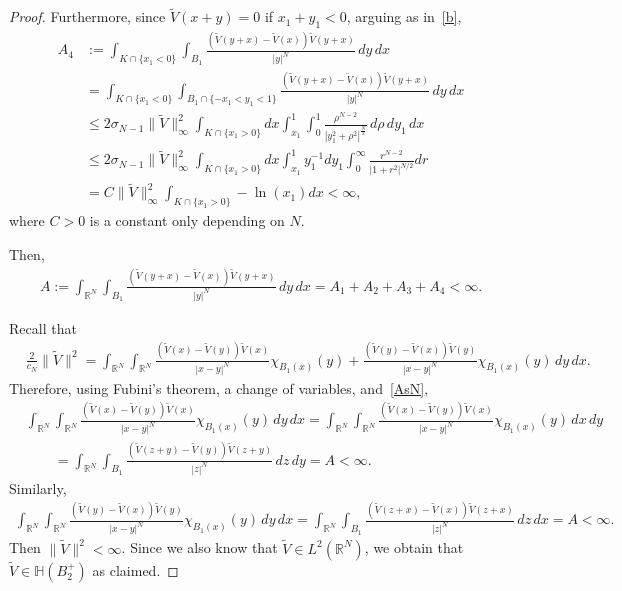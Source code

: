 \documentclass[11pt]{article}
\newcommand{\R}{\mathbb{R}}
\numberwithin{equation}{section}
\begin{document}
\begin{proof}
Furthermore, since $\widetilde V(x+y)=0$ if $x_1+y_1<0$, arguing as in~\eqref{b},
\begin{align*}
A_4&
:=\int_{K\cap\{x_1<0\}}\int_{B_1}\frac{(\widetilde V(y+x)-\widetilde V(x))\widetilde V(y+x)}{|y|^N} \, dy\, dx\\
&=\int_{K\cap\{x_1<0\}}\int_{B_1\cap\{-x_1<y_1<1\}}\frac{(\widetilde V(y+x)-\widetilde V(x))\widetilde V(y+x)}{|y|^N} \, dy\, dx\\
&\leq 2\sigma_{N-1}\|\widetilde V\|^2_\infty\int_{K\cap\{x_1>0\}}dx\int_{x_1}^1\int_0^1 \frac{\rho^{N-2}}{|y_1^2+\rho^2|^{\frac{N}{2}}} \,d\rho\, dy_1\, dx
\\
& \leq 2\sigma_{N-1}\|\widetilde V\|^2_\infty\int_{K\cap\{x_1>0\}} dx \int_{x_1}^{1}y_1^{-1}dy_1\int_0^\infty \frac{r^{N-2}}{|1+r^2|^{N/2}}dr\\
&= C \|\widetilde V\|^2_\infty \int_{K\cap\{x_1>0\}}-\ln(x_1) dx < \infty,
\end{align*}
where $C>0$ is a constant only depending on $N$.

Then,
\begin{align}\label{AsN}
A:=\int_{\R^N}\int_{B_1}\frac{(\widetilde V(y+x)-\widetilde V(x))\widetilde V(y+x)}{|y|^N}
    \, dy\, dx=A_1+A_2+A_3+A_4<\infty.
\end{align}

Recall that
\begin{align*}
&\frac{2}{c_N}\|\widetilde V\|^2
=\int_{\R^N}\int_{\R^N}
    \frac{(\widetilde V(x)-\widetilde V(y))\widetilde V(x)}{|x-y|^N}\chi_{B_1(x)}(y)
    +\frac{(\widetilde V(y)-\widetilde V(x))\widetilde V(y)}{|x-y|^N}\chi_{B_1(x)}(y)
    \, dy\, dx.
\end{align*}
Therefore, using Fubini's theorem, a change of variables,
and~\eqref{AsN},
    \begin{align*}
&\int_{\R^N}\int_{\R^N}
    \frac{(\widetilde V(x)-\widetilde V(y))\widetilde V(x)}{|x-y|^N}\chi_{B_1(x)}(y)
    \, dy\, dx
    =\int_{\R^N}\int_{\R^N}
    \frac{(\widetilde V(x)-\widetilde V(y))\widetilde V(x)}{|x-y|^N}\chi_{B_1(x)}(y)\, dx\, dy\\
&\qquad =\int_{\R^N}\int_{B_1}
    \frac{(\widetilde V(z+y)-\widetilde V(y))\widetilde V(z+y)}{|z|^N}\, dz\, dy=A
    <\infty.
\end{align*}
Similarly, 
\begin{align*}
    \int_{\R^N}\int_{\R^N}
    \frac{(\widetilde V(y)-\widetilde V(x))\widetilde V(y)}{|x-y|^N}\chi_{B_1(x)}(y)
    \, dy\, dx
    =\int_{\R^N}\int_{B_1}\frac{(\widetilde V(z+x)-\widetilde V(x))\widetilde V(z+x)}{|z|^N}
    \, dz\, dx=A<\infty.
\end{align*}
Then $\|\widetilde V\|^2<\infty$.  Since we also know that $\widetilde V\in L^2(\R^N)$, we obtain that $\widetilde V\in \mathbb H(B_2^+)$ as claimed.
\end{proof}
\end{document}
